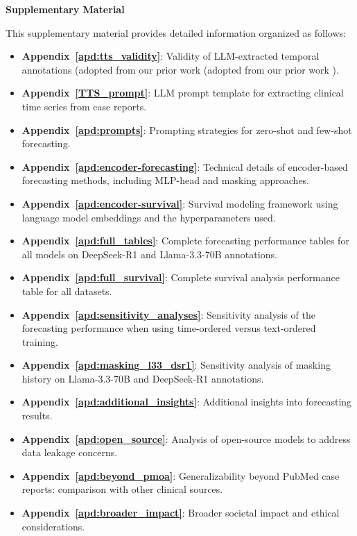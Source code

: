 
% 

\setcounter{secnumdepth}{1}

\renewcommand{\thetable}{A\arabic{table}}
\setcounter{table}{0}

\begin{center}
    {\LARGE \bfseries Supplementary Material}
\end{center}
\vspace{1em} 

This supplementary material provides detailed information organized as follows:
\begin{itemize}
    \item \textbf{Appendix~\ref{apd:tts_validity}}: Validity of LLM-extracted temporal annotations (adopted from our prior work (adopted from our prior work \cite{wang2025large}).
    \item \textbf{Appendix~\ref{TTS_prompt}}: LLM prompt template for extracting clinical time series from case reports.
    \item \textbf{Appendix~\ref{apd:prompts}}: Prompting strategies for zero-shot and few-shot forecasting.
    \item \textbf{Appendix~\ref{apd:encoder-forecasting}}: Technical details of encoder-based forecasting methods, including MLP-head and masking approaches.
    \item \textbf{Appendix~\ref{apd:encoder-survival}}: Survival modeling framework using language model embeddings and the hyperparameters used.
    \item \textbf{Appendix~\ref{apd:full_tables}}: Complete forecasting performance tables for all models on DeepSeek-R1 and Llama-3.3-70B annotations.
    \item \textbf{Appendix~\ref{apd:full_survival}}: Complete survival analysis performance table for all datasets.
    \item \textbf{Appendix~\ref{apd:sensitivity_analyses}}: Sensitivity analysis of the forecasting performance when using time-ordered versus text-ordered training.
    \item \textbf{Appendix~\ref{apd:masking_l33_dsr1}}: Sensitivity analysis of masking history on Llama-3.3-70B and DeepSeek-R1 annotations.
    \item \textbf{Appendix~\ref{apd:additional_insights}}: Additional insights into forecasting results.
    \item \textbf{Appendix~\ref{apd:open_source}}: Analysis of open-source models to address data leakage concerns.
    \item \textbf{Appendix~\ref{apd:beyond_pmoa}}: Generalizability beyond PubMed case reports: comparison with other clinical sources.
    \item \textbf{Appendix~\ref{apd:broader_impact}}: Broader societal impact and ethical considerations.
\end{itemize}

